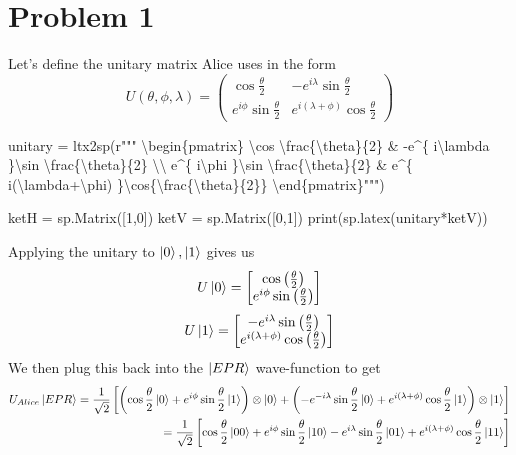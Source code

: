 \documentclass[]{article}
\newenvironment{Shaded}{\begin{snugshade}}{\end{snugshade}}
\newcommand{\NormalTok}[1]{#1}
\begin{document}

\hypertarget{problem-1}{%
\section{Problem 1}\label{problem-1}}


Let's define the unitary matrix Alice uses in the form \[
U(\theta,\phi,\lambda)=
\begin{pmatrix}
\cos \frac{\theta}{2} & -e^{ i\lambda  }\sin \frac{\theta}{2} \\
e^{ i\phi  }\sin \frac{\theta}{2} & e^{ i(\lambda+\phi) }\cos{\frac{\theta}{2}}
\end{pmatrix}
\]

\begin{Shaded}
\begin{Highlighting}[]
\NormalTok{unitary = ltx2sp(r"""}
\NormalTok{\textbackslash{}begin\{pmatrix\}}
\NormalTok{\textbackslash{}cos \textbackslash{}frac\{\textbackslash{}theta\}\{2\} \& {-}e\^{}\{ i\textbackslash{}lambda  \}\textbackslash{}sin \textbackslash{}frac\{\textbackslash{}theta\}\{2\} \textbackslash{}\textbackslash{}}
\NormalTok{e\^{}\{ i\textbackslash{}phi  \}\textbackslash{}sin \textbackslash{}frac\{\textbackslash{}theta\}\{2\} \& e\^{}\{ i(\textbackslash{}lambda+\textbackslash{}phi) \}\textbackslash{}cos\{\textbackslash{}frac\{\textbackslash{}theta\}\{2\}\}}
\NormalTok{\textbackslash{}end\{pmatrix\}""")}

\NormalTok{ketH = sp.Matrix([1,0])}
\NormalTok{ketV = sp.Matrix([0,1])}
\NormalTok{print(sp.latex(unitary*ketV))}
\end{Highlighting}
\end{Shaded}

Applying the unitary to \(\ket{0},\ket{1}\) gives us \[
U\ket{0}  = \left[\begin{matrix}\cos{\left(\frac{\theta}{2} \right)}\\e^{i \phi} \sin{\left(\frac{\theta}{2} \right)}\end{matrix}\right]
\] \[
U\ket{1}  = \left[\begin{matrix}- e^{i \lambda} \sin{\left(\frac{\theta}{2} \right)}\\e^{i \left(\lambda + \phi\right)} \cos{\left(\frac{\theta}{2} \right)}\end{matrix}\right]
\] We then plug this back into the \(\ket{EPR}\) wave-function to get \[
\begin{align}
U_{Alice}\ket{EPR}  = \frac{1}{\sqrt{ 2 }} \left[ {\left( \cos \frac{\theta}{2}\ket{0} +e^{ i\phi }\sin \frac{\theta}{2}\ket{1}  \right)\otimes \ket{0} +\left(- e^{ -i\lambda }\sin \frac{\theta}{2}\ket{0} +e^{ i\left( \lambda+\phi \right) }\cos \frac{\theta}{2}\ket{1} \right)\otimes \ket{1}   } \right] \\
=\frac{1}{\sqrt{ 2 }}\left[ \cos \frac{\theta}{2}\ket{00}+e^{ i\phi }\sin \frac{\theta}{2}\ket{10} -e^{ i\lambda }\sin \frac{\theta}{2}\ket{01} +e^{ i(\lambda+\phi) }\cos \frac{\theta}{2}\ket{11}   \right] 
\end{align}
\]
\end{document}
